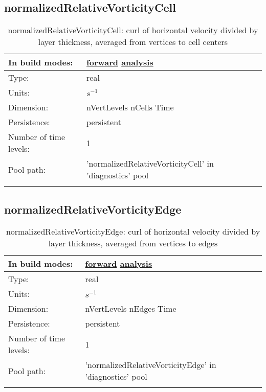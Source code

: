 \subsection[normalizedRelativeVorticityCell]{normalizedRelativeVorticityCell}
\label{subsec:var_sec_diagnostics_normalizedRelativeVorticityCell}
\begin{center}
\begin{longtable}{| p{2.0in} | p{4.0in} |}
        \hline 
        In build modes: & \hyperref[subsec:forward_var_tab_diagnostics]{forward} \hyperref[subsec:analysis_var_tab_diagnostics]{analysis} \\
        \hline 
        Type: & real \\
        \hline 
        Units: & $s^{-1}$ \\
        \hline 
        Dimension: & nVertLevels nCells Time \\
        \hline 
        Persistence: & persistent \\
        \hline 
        Number of time levels: & 1 \\
        \hline 
            Pool path: & 'normalizedRelativeVorticityCell' in 'diagnostics' pool
 \\
		 \hline 
    \caption{normalizedRelativeVorticityCell: curl of horizontal velocity divided by layer thickness, averaged from vertices to cell centers}
\end{longtable}
\end{center}
\subsection[normalizedRelativeVorticityEdge]{normalizedRelativeVorticityEdge}
\label{subsec:var_sec_diagnostics_normalizedRelativeVorticityEdge}
\begin{center}
\begin{longtable}{| p{2.0in} | p{4.0in} |}
        \hline 
        In build modes: & \hyperref[subsec:forward_var_tab_diagnostics]{forward} \hyperref[subsec:analysis_var_tab_diagnostics]{analysis} \\
        \hline 
        Type: & real \\
        \hline 
        Units: & $s^{-1}$ \\
        \hline 
        Dimension: & nVertLevels nEdges Time \\
        \hline 
        Persistence: & persistent \\
        \hline 
        Number of time levels: & 1 \\
        \hline 
            Pool path: & 'normalizedRelativeVorticityEdge' in 'diagnostics' pool
 \\
		 \hline 
    \caption{normalizedRelativeVorticityEdge: curl of horizontal velocity divided by layer thickness, averaged from vertices to edges}
\end{longtable}
\end{center}
